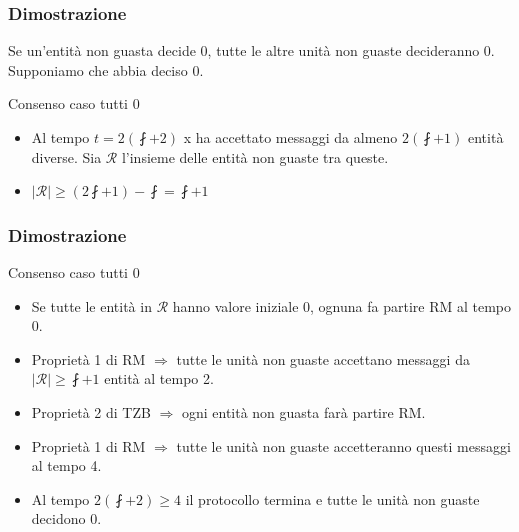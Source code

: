 		\begin{frame}
			\frametitle{Dimostrazione}
			Se un'entità non guasta decide 0, tutte le altre unità non guaste decideranno 0. Supponiamo che \nguasta abbia deciso 0.
			\begin{block}{Consenso caso tutti 0}
				\begin{itemize}
					\item Al tempo $t = 2(\fint + 2)$ x ha accettato messaggi da almeno $2(\fint + 1)$ entità diverse. Sia $\mathcal{R}$ l'insieme delle entità non guaste tra queste.
					\item $|\mathcal{R}| \geq (2\fint + 1) - \fint = \fint + 1$
				\end{itemize}			
			\end{block}
		\end{frame}
	
		\begin{frame}
			\frametitle{Dimostrazione}
			\begin{block}{Consenso caso tutti 0}
				\begin{itemize}
					\item Se tutte le entità in $\mathcal{R}$ hanno valore iniziale 0, ognuna fa partire RM al tempo 0.
					\item Proprietà 1 di RM $\Rightarrow$ tutte le unità non guaste accettano messaggi da $|\mathcal{R}| \geq \fint + 1$ entità al tempo 2.
					\item Proprietà 2 di TZB $\Rightarrow$ ogni entità non guasta farà partire RM.
					\item Proprietà 1 di RM $\Rightarrow$ tutte le unità non guaste accetteranno questi messaggi al tempo 4.
					\item Al tempo $2(\fint + 2) \geq 4$ il protocollo termina e tutte le unità non guaste decidono 0.
				\end{itemize}			
			\end{block}
		\end{frame}
	
